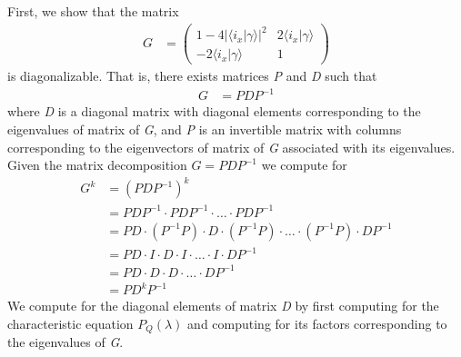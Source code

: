 First, we show that the matrix
\begin{align}
G &=
\begin{pmatrix}
1-4\left\vert\langle i_{x} \vert \gamma \rangle\right\vert^{2} & 2\langle i_{x} \vert \gamma \rangle\\
-2\langle i_{x} \vert \gamma \rangle & 1
\end{pmatrix}
\end{align}
is diagonalizable. That is, there exists matrices \textit{P} and \textit{D} such that
\begin{align}
G &= PDP^{-1}
\end{align}
where \textit{D} is a diagonal matrix with diagonal elements corresponding to the eigenvalues of matrix of \textit{G}, and \textit{P} is an invertible matrix with columns corresponding to the eigenvectors of matrix of \textit{G} associated with its eigenvalues. Given the matrix decomposition $G = PDP^{-1}$ we compute for 
\begin{align}
G^{k} &= (PDP^{-1})^{k}\\
	&= PDP^{-1} \cdot PDP^{-1} \cdot \ldots \cdot PDP^{-1} \nonumber\\
	&= PD \cdot (P^{-1}P) \cdot D \cdot (P^{-1}P) \cdot \ldots \cdot (P^{-1}P) \cdot DP^{-1} \nonumber\\
	&= PD \cdot I \cdot D \cdot I \cdot \ldots \cdot I \cdot DP^{-1} \nonumber\\
	&= PD \cdot D \cdot D \cdot \ldots \cdot DP^{-1} \nonumber\\
	&= PD^{k}P^{-1}
\end{align}
We compute for the diagonal elements of matrix \textit{D} by first computing for the characteristic equation $P_Q(\lambda)$ and computing for its factors corresponding to the eigenvalues of \textit{G}.
